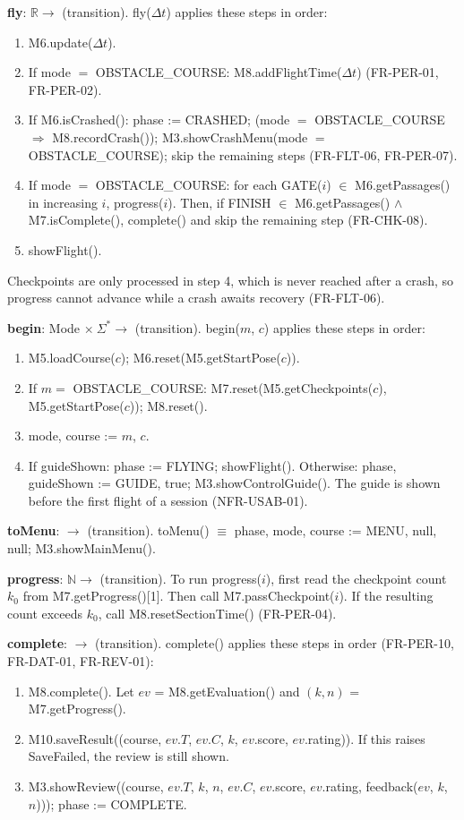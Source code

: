 \documentclass[12pt, titlepage]{article}
\newcommand{\True}{\textnormal{true}}
\newcommand{\nul}{\textnormal{null}}
\begin{document}
\noindent \textbf{fly}: $\mathbb{R} \rightarrow$ (transition). fly($\Delta t$)
applies these steps in order:
\begin{enumerate}
\item M6.update($\Delta t$).
\item If mode $=$ OBSTACLE\_COURSE: M8.addFlightTime($\Delta t$) (FR-PER-01,
  FR-PER-02).
\item If M6.isCrashed(): phase := CRASHED; (mode $=$ OBSTACLE\_COURSE
  $\Rightarrow$ M8.recordCrash()); M3.showCrashMenu(mode $=$
  OBSTACLE\_COURSE); skip the remaining steps (FR-FLT-06, FR-PER-07).
\item If mode $=$ OBSTACLE\_COURSE: for each GATE($i$) $\in$
  M6.getPassages() in increasing $i$, progress($i$). Then, if FINISH $\in$
  M6.getPassages() $\wedge$ M7.isComplete(), complete() and skip the
  remaining step (FR-CHK-08).
\item showFlight().
\end{enumerate}
Checkpoints are only processed in step 4, which is never reached after a crash,
so progress cannot advance while a crash awaits recovery (FR-FLT-06).

\noindent \textbf{begin}: Mode $\times\ \Sigma^* \rightarrow$ (transition).
begin($m$, $c$) applies these steps in order:
\begin{enumerate}
\item M5.loadCourse($c$); M6.reset(M5.getStartPose($c$)).
\item If $m =$ OBSTACLE\_COURSE: M7.reset(M5.getCheckpoints($c$),
  M5.getStartPose($c$)); M8.reset().
\item mode, course := $m$, $c$.
\item If guideShown: phase := FLYING; showFlight(). Otherwise: phase,
  guideShown := GUIDE, \True; M3.showControlGuide(). The guide is shown before
  the first flight of a session (NFR-USAB-01).
\end{enumerate}

\noindent \textbf{toMenu}: $\rightarrow$ (transition). toMenu() $\equiv$
phase, mode, course := MENU, \nul, \nul; M3.showMainMenu().

\noindent \textbf{progress}: $\mathbb{N} \rightarrow$ (transition).
To run progress($i$), first read the checkpoint count $k_0$ from
M7.getProgress()[1]. Then call M7.passCheckpoint($i$). If the resulting
count exceeds $k_0$, call M8.resetSectionTime() (FR-PER-04).

\noindent \textbf{complete}: $\rightarrow$ (transition). complete() applies
these steps in order (FR-PER-10, FR-DAT-01, FR-REV-01):
\begin{enumerate}
\item M8.complete(). Let $ev$ = M8.getEvaluation() and $(k, n)$ =
  M7.getProgress().
\item M10.saveResult((course, $ev.T$, $ev.C$, $k$, $ev$.score, $ev$.rating)).
  If this raises SaveFailed, the review is still shown.
\item M3.showReview((course, $ev.T$, $k$, $n$, $ev.C$, $ev$.score,
  $ev$.rating, feedback($ev$, $k$, $n$))); phase := COMPLETE.
\end{enumerate}
\end{document}
